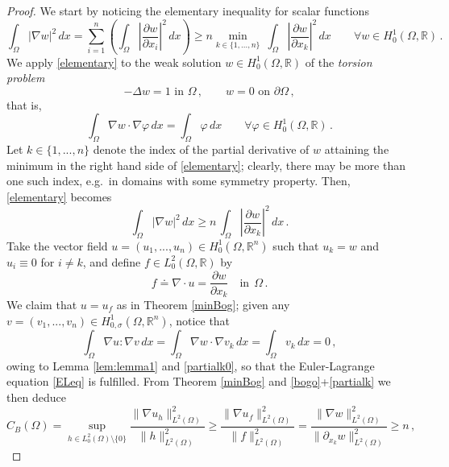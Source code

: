 \documentclass[10pt,a4paper]{amsart}
\newcommand{\R}{\mathbb{R}}
\begin{document}
\noindent\begin{proof} We start by noticing the elementary inequality for scalar functions
	\begin{equation}\label{elementary}
	\int_\Omega|\nabla w|^2 \, dx=\sum_{i=1}^{n} \left( \int_\Omega \left| \dfrac{\partial w}{\partial x_{i}} \right|^2 \, dx \right) \ge n \min_{k \in \{1,...,n \} }\ \int_\Omega \left| \dfrac{\partial w}{\partial x_{k}} \right|^2\, dx \qquad
	\forall w\in H^1_0(\Omega, \mathbb{R})\, .
	\end{equation}
	We apply \eqref{elementary} to the weak solution $w\in H^1_0(\Omega, \mathbb{R})$ of the {\em torsion problem}
\begin{equation}\label{torsionpb}
- \Delta w = 1\mbox{ in }\Omega \, ,\qquad w = 0\mbox{ on }\partial \Omega \, ,
\end{equation}
that is,
\begin{equation}\label{partialk0}
\int_\Omega \nabla w \cdot \nabla \varphi \, dx = \int_\Omega \varphi \, dx\qquad \forall \varphi \in H^1_0(\Omega, \mathbb{R}) \, .
\end{equation}
Let  $k\in\{1,...,n\}$ denote  the index of the partial derivative of $w$ attaining the minimum in the right hand side of \eqref{elementary};
	clearly, there may be more than one such index, e.g.\ in domains with some symmetry property. Then, \eqref{elementary} becomes
	\begin{equation}\label{partialk}
	\int_\Omega|\nabla w|^2 \, dx\ge n\, \int_\Omega \left| \dfrac{\partial w}{\partial x_{k}} \right|^2 \, dx \, .
	\end{equation}
	Take the vector field $u=(u_1,...,u_n)\in H^1_0(\Omega, \mathbb{R}^{n})$ such that $u_k=w$ and $u_i\equiv0$ for $i\neq k$, and define $f \in L_{0}^{2}(\Omega, \R)$ by
	$$
	f\doteq\nabla\cdot u=\dfrac{\partial w}{\partial x_{k}} \quad \text{in} \ \ \Omega \, .
	$$
	We claim that $u = u_f$ as in Theorem \ref{minBog}; given any $v = (v_{1},...,v_{n}) \in H^{1}_{0,\sigma}(\Omega, \mathbb{R}^{n})$, notice that
	$$
	\int_{\Omega} \nabla u : \nabla v \, dx= \int_{\Omega} \nabla w \cdot \nabla v_{k}\, dx = \int_{\Omega} v_{k}\, dx = 0 \, ,
	$$
	owing to Lemma \ref{lem:lemma1} and \eqref{partialk0}, so that the Euler-Lagrange equation \eqref{ELeq} is fulfilled.
	From Theorem \ref{minBog} and \eqref{bogo}+\eqref{partialk} we then deduce
	$$
	C_B(\Omega)=\sup_ {h \in L^2_0(\Omega) \setminus \{0\}}\frac{\|\nabla u_h\|_{L^2(\Omega)}^2}{\|h\|_{L^2(\Omega)}^2} \geq \frac{\|\nabla u_f\|_{L^2(\Omega)}^2}{\|f\|_{L^2(\Omega)}^2}=\frac{\|\nabla w\|_{L^2(\Omega)}^2}{\|\partial_{x_k}w\|_{L^2(\Omega)}^2} \ge n \, ,
$$
\end{proof}
\end{document}
